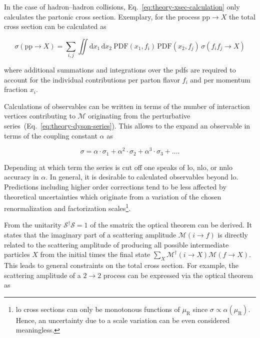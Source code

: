 In the case of hadron--hadron collisions, Eq.~\ref{eq:theory-xsec-calculation} only calculates the partonic cross section. Exemplary, for the process $\mathrm{pp}\to X$ the total cross section can be calculated as

\begin{equation}
\sigma(\mathrm{pp}\to X)=\sum_{i,j}\iint\mathrm{d}x_{1}\,\mathrm{d}x_{2}~\mathrm{PDF}(x_{1},f_{i})\,\mathrm{PDF}(x_{2},f_{j})\,\sigma(f_{i}f_{j}\to X)
\end{equation}

where additional summations and integrations over the \glspl{pdf} are required to account for the individual contributions per parton flavor $f_{i}$ and per momentum fraction $x_{i}$.



Calculations of observables can be written in terms of the number of interaction vertices contributing to $\mathcal{M}$ originating from the perturbative series~(Eq.~\ref{eq:theory-dyson-series}). This allows to the expand an observable in terms of the coupling constant $\alpha$ as

\begin{equation}
\sigma=\alpha\cdot\sigma_\mathrm{1}+\alpha^{2}\cdot\sigma_{2}+\alpha^{3}\cdot\sigma_{3}+\ldots.
\end{equation}


Depending at which term the series is cut off one speaks of \gls{lo}, \gls{nlo}, or \gls{nnlo} accuracy in $\alpha$. In general, it is desirable to calculated observables beyond \gls{lo}. Predictions including higher order corrections tend to be less affected by theoretical uncertainties which originate from a variation of the chosen renormalization and factorization scales\footnote{\gls{lo} cross sections can only be monotonous functions of $\mu_\mathrm{R}$ since $\sigma\propto\alpha(\mu_\mathrm{R})$. Hence, an uncertainty due to a scale variation can be even considered meaningless.}.

From the unitarity $\mathcal{S}^{\dagger}\mathcal{S}=1$ of the \gls{smatrix} the optical theorem can be derived. It states that the imaginary part of a scattering amplitude $\mathcal{M}(i\to f)$ is directly related to the scattering amplitude of producing all possible intermediate particles $X$ from the initial times the final state $\sum_{X}\mathcal{M}^\dagger(i\to X)\mathcal{M}(f\to X)$. This leads to general constraints on the total cross section. For example, the scattering amplitude of a $2\to2$ process can be expressed via the optical theorem as

